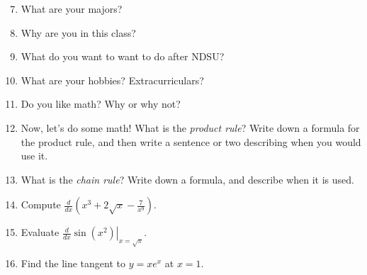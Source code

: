 \documentclass[12pt]{article}
\begin{document}
\begin{enumerate}
\setcounter{enumi}{6}
\item What are your majors?
\vfill
\item Why are you in this class?
\vfill
\item What do you want to want to do after NDSU?
\vfill
\item What are your hobbies?  Extracurriculars?
\vfill
\item Do you like math?  Why or why not?
\vfill
%
\newpage
\item Now, let's do some math!  What is the \emph{product rule}?  Write down a formula for the product rule, and then write a sentence or two describing when you would use it.
\vfill
\item What is the \emph{chain rule}?  Write down a formula, and describe when it is used.
\vfill
\item Compute $\displaystyle \frac{d}{dx} \left(x^3 + 2\sqrt{x} - \frac{7}{x^9}\right)$.
\vfill
\item Evaluate $\displaystyle\left. \frac{d}{dx} \sin(x^2)\right|_{x = \sqrt{\pi}}$.
\vfill
\item Find the line tangent to $y = xe^x$ at $x = 1$.
\vfill
\vfill
\end{enumerate}
\end{document}
